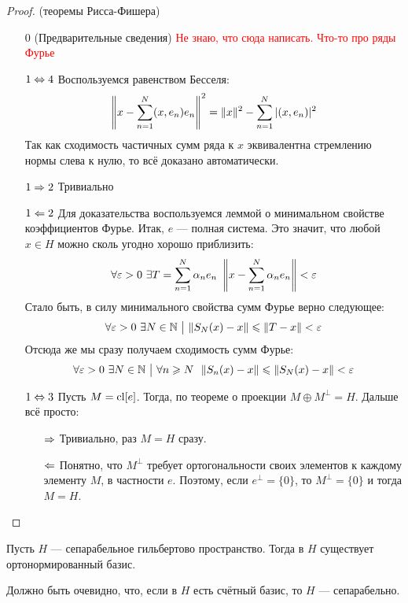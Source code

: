 \begin{proof} (теоремы Рисса-Фишера)
	\begin{itemize}
		\item[$0$] (Предварительные сведения) \textcolor{red}{Не знаю, что сюда написать. Что-то про ряды Фурье}
		
		\item[$1 \Leftrightarrow  4$] Воспользуемся равенством Бесселя:
		\[
			\left\|x - \sum_{n = 1}^N (x, e_n)e_n\right\|^2 = \|x\|^2 - \sum_{n = 1}^N |(x, e_n)|^2
		\]
		Так как сходимость частичных сумм ряда к $x$ эквивалентна стремлению нормы слева к нулю, то всё доказано автоматически.
		
		\item[$1 \Rightarrow 2$] Тривиально
		
		\item[$1 \Leftarrow 2$] Для доказательства воспользуемся леммой о минимальном свойстве коэффициентов Фурье. Итак, $e$ --- полная система. Это значит, что любой $x \in H$ можно сколь угодно хорошо приблизить:
		\[
			\forall \varepsilon > 0\ \exists T = \sum_{n = 1}^N \alpha_n e_n\ \left\|x - \sum_{n = 1}^N \alpha_n e_n\right\| < \varepsilon
		\]
		Стало быть, в силу минимального свойства сумм Фурье верно следующее:
		\[
			\forall \varepsilon > 0\ \exists N \in \mathbb{N} \ \big|\  \|S_N(x) - x\| \leqslant \|T - x\| < \varepsilon
		\]
		Отсюда же мы сразу получаем сходимость сумм Фурье:
		\[
			\forall \varepsilon > 0\ \exists N \in \mathbb{N} \ \big|\  \forall n \geqslant N\ \ \|S_n(x) - x\| \leqslant \|S_N(x) - x\| < \varepsilon
		\]
	
		\item[$1 \Leftrightarrow 3$] Пусть $M = \operatorname{cl} [e]$. Тогда, по теореме о проекции $M \oplus M^\bot = H$. Дальше всё просто:
		\begin{itemize}
			\item[$\Rightarrow$] Тривиально, раз $M = H$ сразу.
			
			\item[$\Leftarrow$] Понятно, что $M^\bot$ требует ортогональности своих элементов к каждому элементу $M$, в частности $e$. Поэтому, если $e^\bot = \{0\}$, то $M^\bot = \{0\}$ и тогда $M = H$.
		\end{itemize}
	\end{itemize}
\end{proof}

\begin{theorem}
	Пусть $H$ --- сепарабельное гильбертово пространство. Тогда в $H$ существует ортонормированный базис.
\end{theorem}

\begin{note}
	Должно быть очевидно, что, если в $H$ есть счётный базис, то $H$ --- сепарабельно.
\end{note}

